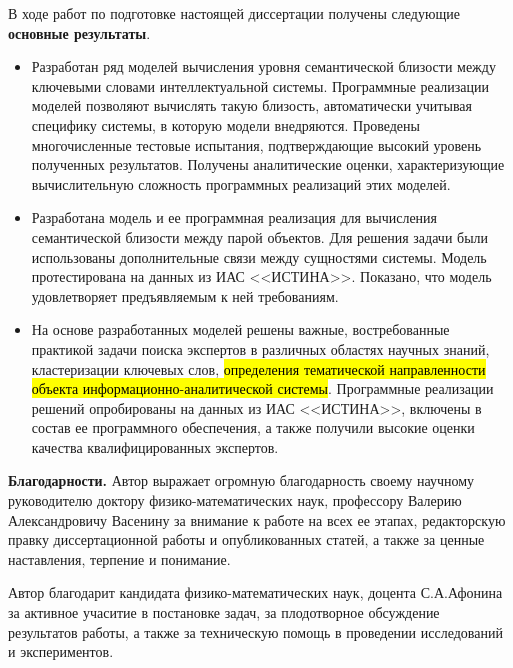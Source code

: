 В ходе работ по подготовке настоящей диссертации получены следующие \textbf{основные результаты}.
\begin{itemize}
    \item Разработан ряд моделей вычисления уровня семантической близости между ключевыми словами интеллектуальной системы. Программные реализации моделей позволяют вычислять такую близость, автоматически учитывая специфику системы, в которую модели внедряются. Проведены многочисленные тестовые испытания, подтверждающие высокий уровень полученных результатов. Получены аналитические оценки, характеризующие вычислительную сложность программных реализаций этих моделей.
    \item Разработана модель и ее программная реализация для вычисления семантической близости между парой объектов. Для решения задачи были использованы дополнительные связи между сущностями системы. Модель протестирована на данных из ИАС <<ИСТИНА>>. Показано, что модель удовлетворяет предъявляемым к ней требованиям.
    \item На основе разработанных моделей решены важные, востребованные практикой задачи поиска экспертов в различных областях научных знаний, кластеризации ключевых слов, \hl{определения тематической направленности объекта информационно-аналитической системы}. Программные реализации решений опробированы на данных из ИАС <<ИСТИНА>>, включены в состав ее программного обеспечения, а также получили высокие оценки качества квалифицированных экспертов.
\end{itemize}

\textbf{Благодарности.} Автор выражает огромную благодарность своему научному руководителю доктору физико-математических наук, профессору Валерию Александровичу Васенину за внимание к работе на всех ее этапах, редакторскую правку диссертационной работы и опубликованных статей, а также за ценные наставления, терпение и понимание.

Автор благодарит кандидата физико-математических наук, доцента С.А.Афонина за активное учаситие в постановке задач, за плодотворное обсуждение результатов работы, а также за техническую помощь в проведении исследований и экспериментов.


